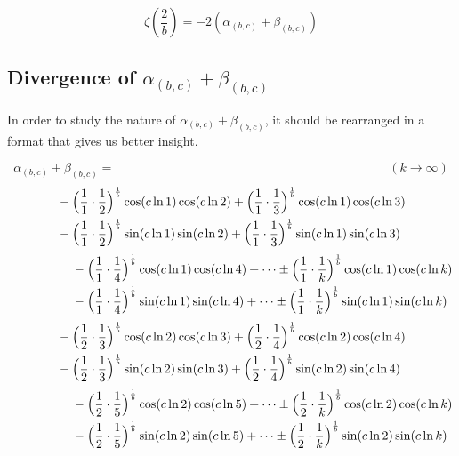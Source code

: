 \documentclass{amsart}
\begin{document}
	\[ \zeta(\frac{2}{b}) = -2(\alpha_{(b,c)} + \beta_{(b,c)}) \]
	
	\subsection{Divergence of $\alpha_{(b,c)} + \beta_{(b,c)}$}
	In order to study the nature of $\alpha_{(b,c)} + \beta_{(b,c)}$, it should be rearranged in a format that gives us better insight.
	
	\[ \alpha_{(b,c)} + \beta_{(b,c)} = \qquad\qquad\qquad\qquad\qquad\qquad\qquad\qquad\qquad\qquad\qquad (k \to \infty) \]
	\[
	\begin{aligned}
		& -\Bigl( \frac{1}{1} \cdot \frac{1}{2} \Bigr)^\frac1b \cos(c \ln1) \cos(c \ln2) + \Bigl( \frac{1}{1} \cdot \frac{1}{3} \Bigr)^\frac1b \cos(c \ln 1) \cos(c \ln 3) \\
		& -\Bigl( \frac{1}{1} \cdot \frac{1}{2} \Bigr)^\frac1b \sin(c \ln1) \sin(c \ln2) + \Bigl( \frac{1}{1} \cdot \frac{1}{3} \Bigr)^\frac1b \sin(c \ln 1) \sin(c \ln 3) 
	\end{aligned}
	\]
	\[
	\begin{aligned}
		\qquad\qquad\quad & -\Bigl( \frac{1}{1} \cdot \frac{1}{4} \Bigr)^\frac1b \cos(c \ln 1) \cos(c \ln 4) + \dots \pm \Bigl( \frac{1}{1} \cdot \frac{1}{k} \Bigr)^\frac1b \cos(c \ln 1) \cos(c \ln k) \\
		& -\Bigl( \frac{1}{1} \cdot \frac{1}{4} \Bigr)^\frac1b \sin(c \ln 1) \sin(c \ln 4) + \dots \pm \Bigl( \frac{1}{1} \cdot \frac{1}{k} \Bigr)^\frac1b \sin(c \ln 1) \sin(c \ln k)
	\end{aligned}
	\]
	\[
	\begin{aligned}
		& -\Bigl( \frac{1}{2} \cdot \frac{1}{3} \Bigr)^\frac1b \cos(c \ln2) \cos(c \ln3) + \Bigl( \frac{1}{2} \cdot \frac{1}{4} \Bigr)^\frac1b \cos(c \ln 2) \cos(c \ln 4) \\
		& -\Bigl( \frac{1}{2} \cdot \frac{1}{3} \Bigr)^\frac1b \sin(c \ln2) \sin(c \ln3) + \Bigl( \frac{1}{2} \cdot \frac{1}{4} \Bigr)^\frac1b \sin(c \ln 2) \sin(c \ln 4) 
	\end{aligned}
	\]
	\[
	\begin{aligned}
		\qquad\qquad\quad & -\Bigl( \frac{1}{2} \cdot \frac{1}{5} \Bigr)^\frac1b \cos(c \ln 2) \cos(c \ln 5) + \dots \pm \Bigl( \frac{1}{2} \cdot \frac{1}{k} \Bigr)^\frac1b \cos(c \ln 2) \cos(c \ln k) \\
		& -\Bigl( \frac{1}{2} \cdot \frac{1}{5} \Bigr)^\frac1b \sin(c \ln 2) \sin(c \ln 5) + \dots \pm \Bigl( \frac{1}{2} \cdot \frac{1}{k} \Bigr)^\frac1b \sin(c \ln 2) \sin(c \ln k)
	\end{aligned}
	\]
\end{document}
